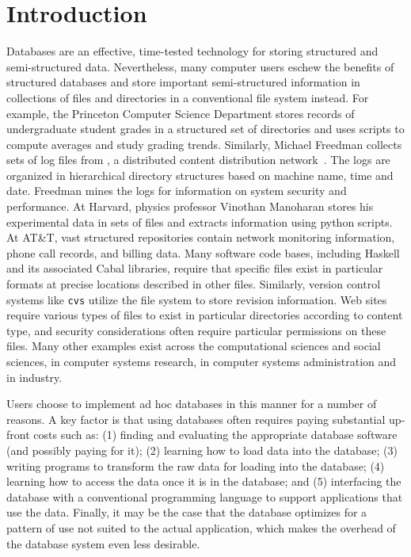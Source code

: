 \section {Introduction}
\label{sec:intro}

Databases are an effective, time-tested technology for storing
structured and semi-structured data.  Nevertheless, many computer
users eschew the benefits of structured databases and store important
semi-structured information in collections of files
and directories in a conventional file system instead.  For example, the
Princeton Computer Science Department
stores records of undergraduate student grades in a structured set of
directories and uses scripts to compute averages and
study grading trends.  Similarly, Michael Freedman collects
sets of log files from \coral, a distributed content distribution
network~\cite{freedman+:coral,freedman:coral-experience}.  
The logs are organized in hierarchical
directory structures based on machine name, time and date.  Freedman
mines the logs for information on system security and performance.  At
Harvard, physics professor Vinothan Manoharan stores 
his experimental data in sets of files and
extracts information using python scripts.  At AT\&T, vast structured
repositories contain network monitoring information,
phone call records, and billing data.  
Many software code bases, including Haskell and its associated Cabal libraries,
require that specific files exist in particular formats at precise
locations described in other files. 
Similarly, version control systems like \texttt{cvs} utilize the file
system to store revision information. Web sites require various types
of files to exist in particular directories according to content type,
and security considerations often require particular permissions on
these files.
Many other examples exist across the computational sciences and social
sciences, in computer systems research, in computer
systems administration and in industry.

Users choose to implement ad hoc databases in this manner for a number
of reasons. A key factor is  that using
databases often requires paying substantial up-front costs such as:
(1) finding and evaluating the appropriate database software (and
possibly paying for it); (2) learning how to load data into the
database; (3) writing programs to transform the raw data for loading into the database; (4) learning how
to access the data once it is in the database; and (5) interfacing the
database with a conventional programming language to support
applications that use the data.  Finally, it may be the case that the
database optimizes for a pattern of use not suited to the actual
application, which makes the overhead of the database system even
less desirable. 

